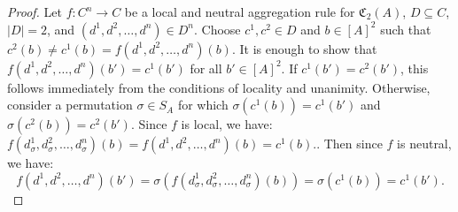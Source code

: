 \documentclass[10pt,a4paper]{amsart}
\begin{document}
\begin{proof}
	Let $f:C^n\to C$ be a local and neutral aggregation rule for $\mathfrak C_2(A)$, $D\subseteq C$, $|D|=2$, and $(d^1, d^2, \ldots, d^n)\in D^n$. Choose $c^1, c^2\in D$ and $b\in [A]^2$ such that $c^2(b)\neq c^1(b)=f(d^1, d^2, \ldots, d^n)(b)$. It is enough to show that $f(d^1, d^2, \ldots, d^n)(b')=c^1(b')$ for all $b'\in [A]^2$. If $c^1(b')=c^2(b')$, this follows immediately from the conditions of locality and unanimity. Otherwise, consider a permutation $\sigma\in S_A$ for which $\sigma(c^1(b))=c^1(b')$ and $\sigma(c^2(b))=c^2(b')$. Since $f$ is local, we have:
	$
	f(d^1_\sigma, d^2_\sigma, \ldots, d^n_\sigma)(b)= f(d^1, d^2, \ldots, d^n)(b)=c^1(b).
	$.
	Then since $f$ is neutral, we have:
	$$
	f(d^1, d^2, \ldots, d^n)(b')=\sigma(f(d^1_\sigma, d^2_\sigma, \ldots, d^n_\sigma)(b))=\sigma(c^1(b))=c^1(b').
	$$
\end{proof}
\end{document}
